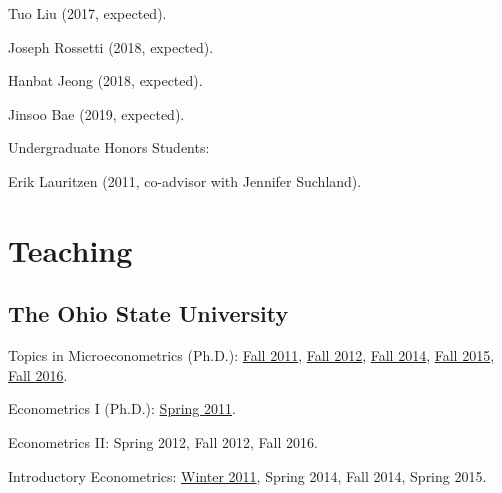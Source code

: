 \documentclass[10pt,letterpaper]{article}
\renewenvironment{itemize}{
  \begin{list}{}{
    \setlength{\leftmargin}{1.5em}
    \setlength{\itemsep}{0.25em}
    \setlength{\parskip}{0pt}
    \setlength{\parsep}{0.25em}
  }
}{
  \end{list}
}
\begin{document}
\begin{itemize}
\begin{itemize}
  \item Tuo Liu (2017, expected).
  \item Joseph Rossetti (2018, expected).
  \item Hanbat Jeong (2018, expected).
  \item Jinsoo Bae (2019, expected).
  \end{itemize}
\item Undergraduate Honors Students:
  \begin{itemize}
  \item Erik Lauritzen (2011, co-advisor with Jennifer Suchland).
  \end{itemize}
\end{itemize}

\section*{Teaching}

\subsection*{The Ohio State University}

\begin{itemize}
\item Topics in Microeconometrics (Ph.D.):
  \href{http://jblevins.org/courses/econ843f11/}{Fall 2011}, %
  \href{http://jblevins.org/courses/econ8833f12/}{Fall 2012}, %
  \href{http://jblevins.org/courses/econ8833f14/}{Fall 2014}, %
  \href{http://jblevins.org/courses/econ8833f15/}{Fall 2015}, %
  \href{http://jblevins.org/courses/econ8833f16/}{Fall 2016}. %
\item Econometrics I (Ph.D.):
  \href{http://jblevins.org/courses/econ741s11/}{Spring 2011}. %
\item Econometrics II:
  Spring 2012, %
  Fall 2012, %
  Fall 2016. %
\item Introductory Econometrics:
  \href{http://jblevins.org/courses/econ444w11/}{Winter 2011}, %
  Spring 2014, %
  Fall 2014, %
  Spring 2015. %
\end{itemize}
\end{document}
